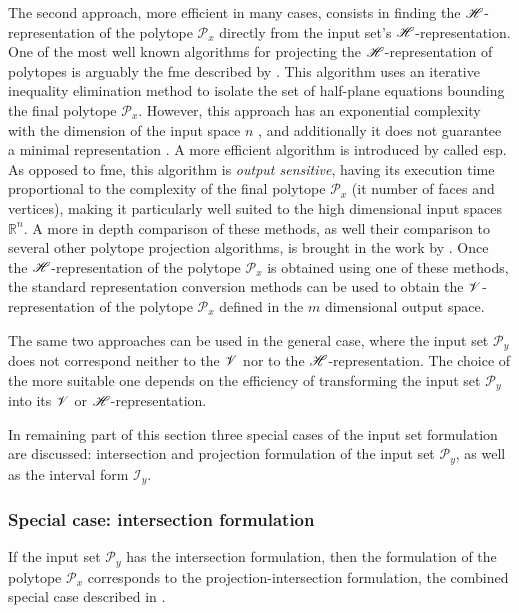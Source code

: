 The second approach, more efficient in many cases, consists in finding the $\mathscr{H}$-representation of the polytope $\mathcal{P}_x$ directly from the input set's $\mathscr{H}$-representation. One of the most well known algorithms for projecting the $\mathscr{H}$-representation of polytopes is arguably the \gls{fme} described by \citet{dantzig1973fourier}.  This algorithm uses an iterative inequality elimination method to isolate the set of half-plane equations bounding the final polytope $\mathcal{P}_x$. However, this approach has an exponential complexity with the dimension of the input space $n$ \cite{Talaashrafi2020complexity}, and additionally it does not guarantee a minimal representation \cite{Monniaux2010}. A more efficient algorithm is introduced by \citet{jones2004equality} called \gls{esp}. As opposed to \gls{fme}, this algorithm is \textit{output sensitive}, having its execution time proportional to the complexity of the final polytope $\mathcal{P}_x$ (it number of faces and vertices), making it particularly well suited to the high dimensional input spaces $\mathbb{R}^n$. A more in depth comparison of these methods, as well their comparison to several other polytope projection algorithms, is brought in the work by \citet{Gl_le_2018}. Once the $\mathscr{H}$-representation of the polytope $\mathcal{P}_x$ is obtained using one of these methods, the standard representation conversion methods can be used to obtain the $\mathscr{V}$-representation of the polytope $\mathcal{P}_x$ defined in the $m$ dimensional output space.

The same two approaches can be used in the general case, where the input set $\mathcal{P}_y$ does not correspond neither to the $\mathscr{V}$ nor to the $\mathscr{H}$-representation. The choice of the more suitable one depends on the efficiency of transforming the input set $\mathcal{P}_y$ into its $\mathscr{V}$ or $\mathscr{H}$-representation. 

In remaining part of this section three special cases of the input set formulation are discussed: intersection and projection formulation of the input set $\mathcal{P}_y$, as well as the interval form $\mathcal{I}_y$.

\subsubsection*{Special case: intersection formulation} If the input set $\mathcal{P}_y$ has the intersection formulation, then the formulation of the polytope $\mathcal{P}_x$ corresponds to the projection-intersection formulation, the combined special case  described in .

